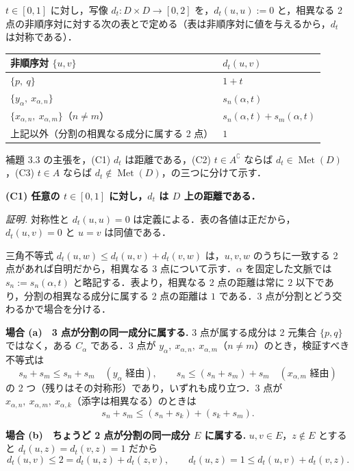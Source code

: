 \documentclass[
  lualatex,ja=standard]{bxjsarticle}
\begin{document}
\(t \in [0,1]\) に対し，写像 \(d_t : D \times D \to [0,2]\)
を，\(d_t(u,u) := 0\) と，相異なる 2
点の非順序対に対する次の表とで定める（表は非順序対に値を与えるから，\(d_t\)
は対称である）．

\begin{longtable}[]{@{}ll@{}}
\toprule
非順序対 \(\{u,v\}\) & \(d_t(u,v)\) \\
\midrule
\endhead
\(\{p,\ q\}\) & \(1 + t\) \\
\(\{y_\alpha,\ x_{\alpha,n}\}\) & \(s_n(\alpha,t)\) \\
\(\{x_{\alpha,n},\ x_{\alpha,m}\}\)（\(n \ne m\)） &
\(s_n(\alpha,t) + s_m(\alpha,t)\) \\
上記以外（分割の相異なる成分に属する 2 点） & \(1\) \\
\bottomrule
\end{longtable}

補題 3.3 の主張を，(C1) \(d_t\) は距離である，(C2)
\(t \in A^\complement\) ならば \(d_t \in \operatorname{Met}(D)\)，(C3)
\(t \in A\) ならば
\(d_t \notin \operatorname{Met}(D)\)，の三つに分けて示す．

\textbf{(C1) 任意の \(t \in [0,1]\) に対し，\(d_t\) は \(D\)
上の距離である．}

\emph{証明.} 対称性と \(d_t(u,u) = 0\)
は定義による．表の各値は正だから，\(d_t(u,v) = 0\) と \(u = v\)
は同値である．

三角不等式 \(d_t(u,w) \le d_t(u,v) + d_t(v,w)\) は，\(u,v,w\)
のうちに一致する 2 点があれば自明だから，相異なる 3
点について示す．\(\alpha\) を固定した文脈では \(s_n := s_n(\alpha,t)\)
と略記する．表より，相異なる 2 点の距離は常に \(2\)
以下であり，分割の相異なる成分に属する 2 点の距離は \(1\) である．3
点が分割とどう交わるかで場合を分ける．

\textbf{場合 (a)　3 点が分割の同一成分に属する.} 3 点が属する成分は 2
元集合 \(\{p, q\}\) ではなく，ある \(C_\alpha\) である．3 点が
\(y_\alpha,\ x_{\alpha,n},\ x_{\alpha,m}\)（\(n \ne m\)）のとき，検証すべき不等式は
\[s_n + s_m \le s_n + s_m \quad (y_\alpha \text{ 経由}), \qquad s_n \le (s_n + s_m) + s_m \quad (x_{\alpha,m} \text{ 経由})\]
の 2 つ（残りはその対称形）であり，いずれも成り立つ．3 点が
\(x_{\alpha,n},\ x_{\alpha,m},\ x_{\alpha,k}\)（添字は相異なる）のときは
\[s_n + s_m \le (s_n + s_k) + (s_k + s_m).\]

\textbf{場合 (b)　ちょうど 2 点が分割の同一成分 \(E\) に属する.}
\(u, v \in E\)，\(z \notin E\) とすると \(d_t(u,z) = d_t(v,z) = 1\)
だから
\[d_t(u,v) \le 2 = d_t(u,z) + d_t(z,v), \qquad d_t(u,z) = 1 \le d_t(u,v) + d_t(v,z).\]
\end{document}
